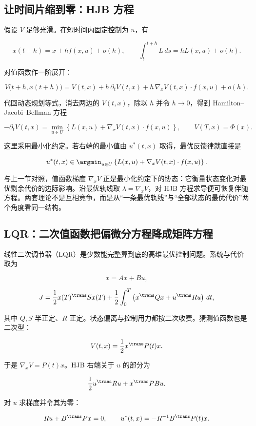 \subsection{让时间片缩到零：HJB 方程}

假设 \(V\) 足够光滑。在短时间内固定控制为 \(u\)，有

\[
x(t+h)=x+h f(x,u)+o(h),
\qquad
\int_t^{t+h}L\,ds=hL(x,u)+o(h).
\]

对值函数作一阶展开：

\[
V\bigl(t+h,x(t+h)\bigr)
=V(t,x)
+h\,\partial_tV(t,x)
+h\,\nabla_xV(t,x)\cdot f(x,u)
+o(h).
\]

代回动态规划等式，消去两边的 \(V(t,x)\)，除以 \(h\) 并令 \(h\to0\)，得到 Hamilton--Jacobi--Bellman 方程

\[
-\partial_tV(t,x)
=
\min_{u\in U}
\left\{
L(x,u)+\nabla_xV(t,x)\cdot f(x,u)
\right\},
\qquad
V(T,x)=\Phi(x).
\]

这里采用最小化约定。若右端的最小值由 \(u^\ast(t,x)\) 取得，最优反馈律就直接是

\[
u^\ast(t,x)
\in
\argmin_{u\in U}
\left\{
L(x,u)+\nabla_xV(t,x)\cdot f(x,u)
\right\}.
\]

与上一节对照，值函数梯度 \(\nabla_xV\) 正是最小化约定下的协态：它衡量状态变化对最优剩余代价的边际影响。沿最优轨线取 \(\lambda=\nabla_xV\)，对 HJB 方程求导便可恢复伴随方程。两套理论不是互相竞争，而是从``一条最优轨线''与``全部状态的最优代价''两个角度看同一结构。

\subsection{LQR：二次值函数把偏微分方程降成矩阵方程}

线性二次调节器（LQR）是少数能完整算到底的高维最优控制问题。系统与代价取为

\[
\dot x=Ax+Bu,
\]

\[
J
=\frac12 x(T)^\trans Sx(T)
+\frac12\int_0^T
\left(
x^\trans Qx+u^\trans Ru
\right)\,dt,
\]

其中 \(Q,S\) 半正定、\(R\) 正定。状态偏离与控制用力都按二次收费。猜测值函数也是二次型：

\[
V(t,x)=\frac12 x^\trans P(t)x.
\]

于是 \(\nabla_xV=P(t)x\)。HJB 右端关于 \(u\) 的部分为

\[
\frac12u^\trans Ru+x^\trans PBu.
\]

对 \(u\) 求梯度并令其为零：

\[
Ru+B^\trans Px=0,
\qquad
u^\ast(t,x)=-R^{-1}B^\trans P(t)x.
\]

